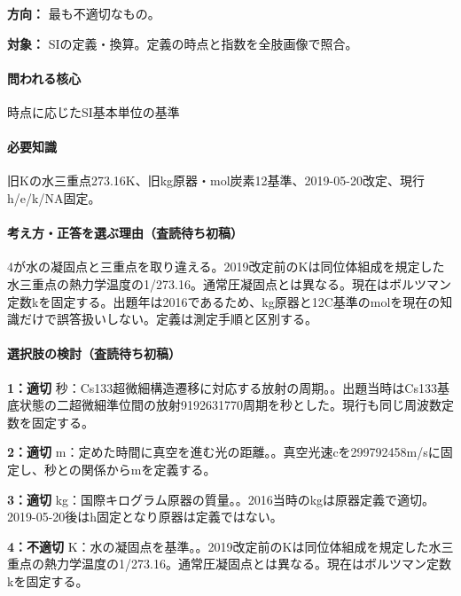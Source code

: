 \noindent\textbf{方向：} 最も不適切なもの。\par

\noindent\textbf{対象：} SIの定義・換算。定義の時点と指数を全肢画像で照合。\par

\paragraph{問われる核心} 時点に応じたSI基本単位の基準

\paragraph{必要知識} 旧Kの水三重点273.16K、旧kg原器・mol炭素12基準、2019-05-20改定、現行h/e/k/NA固定。

\paragraph{考え方・正答を選ぶ理由（査読待ち初稿）} 4が水の凝固点と三重点を取り違える。2019改定前のKは同位体組成を規定した水三重点の熱力学温度の1/273.16。通常圧凝固点とは異なる。現在はボルツマン定数kを固定する。出題年は2016であるため、kg原器と12C基準のmolを現在の知識だけで誤答扱いしない。定義は測定手順と区別する。

\paragraph{選択肢の検討（査読待ち初稿）}\mbox{}\par

\noindent\textbf{1：適切} 秒：Cs133超微細構造遷移に対応する放射の周期。。出題当時はCs133基底状態の二超微細準位間の放射9192631770周期を秒とした。現行も同じ周波数定数を固定する。\par

\noindent\textbf{2：適切} m：定めた時間に真空を進む光の距離。。真空光速cを299792458m/sに固定し、秒との関係からmを定義する。\par

\noindent\textbf{3：適切} kg：国際キログラム原器の質量。。2016当時のkgは原器定義で適切。2019-05-20後はh固定となり原器は定義ではない。\par

\noindent\textbf{4：不適切} K：水の凝固点を基準。。2019改定前のKは同位体組成を規定した水三重点の熱力学温度の1/273.16。通常圧凝固点とは異なる。現在はボルツマン定数kを固定する。\par

